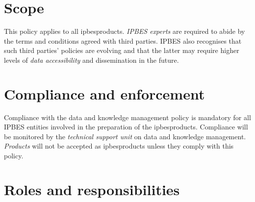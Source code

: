 \documentclass{article}
\begin{document}
\section{Scope}

This policy applies to all \gls{ipbesproducts}. \textit{IPBES experts }are required to abide by the terms and conditions agreed with third parties. IPBES also recognises that such third parties’ policies are evolving and that the latter may require higher levels of \textit{data accessibility} and dissemination in the future.

\section{Compliance and enforcement}

Compliance with the data and knowledge management policy is mandatory for all IPBES entities involved in the preparation of the \gls{ipbesproducts}. Compliance will be monitored by the \textit{technical support unit} on data and knowledge management. \textit{Products} will not be accepted as \gls{ipbesproducts} unless they comply with this policy.

\section{Roles and responsibilities}
\end{document}
